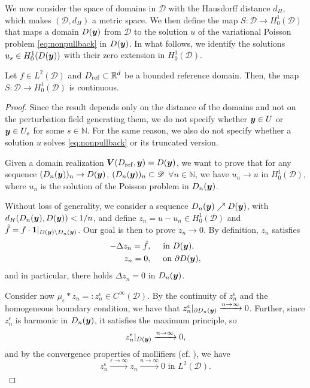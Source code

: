 \documentclass[graybox]{svmult}
\begin{document}
We now consider the space of domains in $\mathscr D$ with the Hausdorff distance $d_H$, which makes $(\mathscr D, d_H)$ a metric space. We then define the map $S: \mathscr D \to H_0^1(\mathscr D)$ that maps a domain $D({\boldsymbol{y}})$ from $\mathscr D$  to the solution $u$ of the variational Poisson problem \eqref{eq:nonpullback} in $D({\boldsymbol{y}})$. In what follows, we identify the solutions $u_s \in H_0^1(D({\boldsymbol{y}}))$ with their zero extension in $H_0^1(\mathscr D)$.

\begin{lemma}
    \label{lemma: continuity forward operator}
    Let $f \in L^2(\mathscr D)$ and $D_{\rm{ref}} \subset \mathbb{R}^d$ be a bounded reference domain. Then, the map $S: \mathscr D \to H_0^1(\mathscr D)$ is continuous.
\end{lemma}

\begin{proof}
    Since the result depends only on the distance of the domains and not on the perturbation field generating them, we do not specify whether ${\boldsymbol{y}} \in U$ or ${\boldsymbol{y}} \in U_s$ for some $s \in \mathbb{N}$. For the same reason, we also do not specify whether a solution $u$ solves \eqref{eq:nonpullback} or its truncated version.
    
    Given a domain realization ${\boldsymbol{V}}(D_{\rm{ref}}, {\boldsymbol{y}}) = D({\boldsymbol{y}})$, we want to prove that for any sequence $(D_n({\boldsymbol{y}}))_n \to D({\boldsymbol{y}})$, $(D_n({\boldsymbol{y}}))_n \subset \mathscr D$ $\forall n \in \mathbb{N}$, we have $u_{n} \to u$ in $H_0^1(\mathscr D)$, where $u_{n}$ is the solution of the Poisson problem in $D_n({\boldsymbol{y}})$. 

    Without loss of generality, we consider a sequence $D_n({\boldsymbol{y}}) \nearrow D({\boldsymbol{y}})$, with $d_{H}(D_n({\boldsymbol{y}}), D({\boldsymbol{y}})) < 1/n$, and define $z_n = u - u_{n} \in H_0^1(\mathscr D)$ and $\tilde{f} = f\cdot\mathbf{1}|_{D({\boldsymbol{y}})\backslash D_n({\boldsymbol{y}})}$. Our goal is then to prove $z_n \to 0$. By definition, $z_n$ satisfies
    \begin{align}   
        \begin{split}
        \label{eq:solution-difference}
        - \Delta z_n = \tilde{f}, \hspace{1.5em} &\text{in } D({\boldsymbol{y}}), \\
        z_n = 0, \hspace{1.5em} &\text{on } \partial D({\boldsymbol{y}}),
        \end{split}
    \end{align}
    and in particular, there holds $\Delta z_n = 0$ in $D_n({\boldsymbol{y}})$.

    Consider now $\mu_\epsilon * z_n =: z_{n}^\epsilon \in C^\infty(\mathscr D)$. By the continuity of $z_{n}^\epsilon$ and the homogeneous boundary condition, we have that $z_{n}^\epsilon|_{\partial D_n({\boldsymbol{y}})} \xrightarrow[]{n \to \infty} 0$. Further, since $z_{n}^\epsilon$ is harmonic in $D_n({\boldsymbol{y}})$, it satisfies the maximum principle, so
    $$
        z_{n}^\epsilon|_{D({\boldsymbol{y}})} \xrightarrow[]{n \to \infty} 0,
    $$
    and by the convergence properties of mollifiers (cf. \cite{GiTr2001}), we have
    $$
        z_{n}^\epsilon \xrightarrow[]{\epsilon \to \infty} z_{n} \xrightarrow[]{n \to \infty} 0 \text{ in } L^2(\mathscr D).
    $$


\end{proof}
\end{document}
